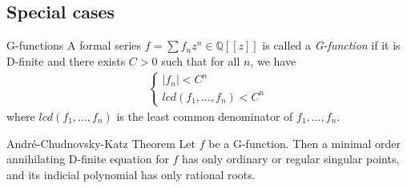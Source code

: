 \documentclass[../main.tex]{subfiles}
\begin{document}
\subsection*{Special cases}

\begin{definition}{G-functions}
	A formal series $f = \sum f_n z^n \in \mathbb{Q}[[z]]$ is called a \emph{G-function} if it is D-finite and there exists $C > 0$ such that for all $n$, we have
	\begin{align*}
	\begin{cases}
	|f_n| < C^n\\
	lcd(f_1, \dots, f_n) < C^n
	\end{cases}
	\end{align*}
	where $lcd(f_1, \dots, f_n)$ is the least common denominator of $f_1, \dots, f_n$.
\end{definition}

\begin{thm}{André-Chudnovsky-Katz Theorem}
	Let $f$ be a G-function. Then a minimal order annihilating D-finite equation for $f$ has only ordinary or regular singular points, and its indicial polynomial has only rational roots.
\end{thm}




\end{document}
